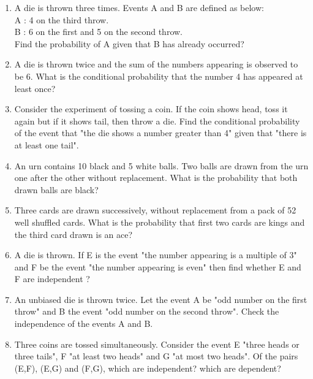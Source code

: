 \begin{enumerate}[label=\arabic*.,ref=\thesubsection.\theenumi]
\item A die is thrown three times. Events A and B are defined as below:\\
A : 4 on the third throw.\\
B : 6 on the first and 5 on the second throw.\\
Find the probability of A given that B has already occurred?\\

\item A die is thrown twice and the sum of the numbers appearing is observed to be 6. What is the conditional probability that the number 4 has appeared at least once?\\

\item Consider the experiment of tossing a coin. If the coin shows head, toss it again but if it shows tail, then throw a die. Find the conditional probability of the event that "the die shows a number greater than 4" given that "there is at least one tail".\\

\item An urn contains 10 black and 5 white balls. Two balls are drawn from the urn one after the other without replacement. What is the probability that both drawn balls are black?\\

\item Three cards are drawn successively, without replacement from a pack of 52 well shuffled cards. What is the probability that first two cards are kings and the third card drawn is an ace?\\

\item A die is thrown. If E is the event "the number appearing is a multiple of 3" and F be the event "the number appearing is even" then find whether E and F are independent ?\\

\item An unbiased die is thrown twice. Let the event A be "odd number on the first throw" and B the event "odd number on the second throw". Check the independence of the events A and B.\\

\item Three coins are tossed simultaneously. Consider the event E "three heads or three tails", F "at least two heads" and G "at most two heads". Of the pairs (E,F), (E,G) and (F,G), which are independent? which are dependent?\\


\end{enumerate}
